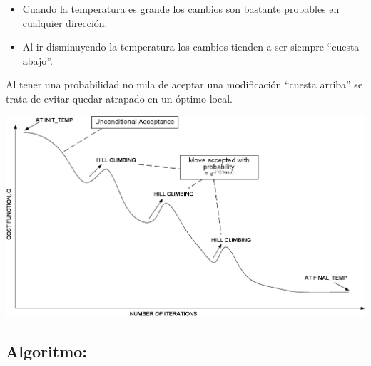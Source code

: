 \documentclass[]{book}
\theoremstyle{definition}
\theoremstyle{definition}
\theoremstyle{definition}
\theoremstyle{remark}
\begin{document}
\begin{itemize}
\item
  Cuando la temperatura es grande los cambios son bastante probables en
  cualquier dirección.
\item
  Al ir disminuyendo la temperatura los cambios tienden a ser siempre
  ``cuesta abajo''.
\end{itemize}

Al tener una probabilidad no nula de aceptar una modificación ``cuesta
arriba'' se trata de evitar quedar atrapado en un óptimo local.

\begin{center}\includegraphics[width=0.7\linewidth]{images/templesimulado} \end{center}

\subsection{Algoritmo:}\label{algoritmo-1}
\end{document}
